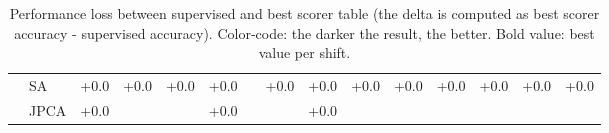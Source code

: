 \begin{table}[H]
\begin{tabular}{c|l|c|c|c|c|c|c|c|c|c|c|c|c|c|}
 & SA & +0.0 & +0.0 & +0.0 & +0.0 & \cellcolor{red!14}{-0.01} & +0.0 & +0.0 & +0.0 & +0.0 & +0.0 & +0.0 & +0.0 & +0.0 \\
 & JPCA & +0.0 & \cellcolor{red!20}{-0.02} & \cellcolor{green!90}{+0.01} & +0.0 & \textbf{\cellcolor{green!90}{+0.04}} & \cellcolor{green!36}{+0.01} & +0.0 & \cellcolor{red!26}{-0.02} & \cellcolor{red!32}{-0.1} & \cellcolor{red!26}{-0.03} & \cellcolor{red!31}{-0.04} & \cellcolor{red!24}{-0.09} & \cellcolor{red!22}{-0.02} \\
\hline
\end{tabular}
\caption{Performance loss between supervised and best scorer table (the delta is computed as best scorer accuracy - supervised accuracy). Color-code: the darker the result, the better. Bold value: best value per shift.}
\end{table}